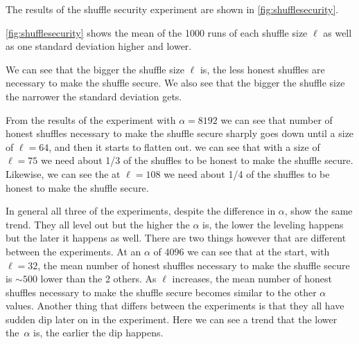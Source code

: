 The results of the shuffle security experiment are shown in \autoref{fig:shufflesecurity}.

\autoref{fig:shufflesecurity} shows the mean of the 1000 runs of each shuffle size $\ell$ as well as one standard deviation higher and lower.

We can see that the bigger the shuffle size $\ell$ is, the less honest shuffles are necessary to make the shuffle secure.
We also see that the bigger the shuffle size the narrower the standard deviation gets.

From the results of the experiment with $\alpha=8192$ we can see that number of honest shuffles necessary to make the shuffle secure sharply goes down until a size of $\ell=64$, and then it starts to flatten out.
we can see that with a size of $\ell=75$ we need about 1/3 of the shuffles to be honest to make the shuffle secure.
Likewise, we can see the at $\ell=108$ we need about 1/4 of the shuffles to be honest to make the shuffle secure.

In general all three of the experiments, despite the difference in $\alpha$, show the same trend.
They all level out but the higher the $\alpha$ is, the lower the leveling happens but the later it happens as well.
There are two things however that are different between the experiments.
At an $\alpha$ of 4096 we can see that at the start, with $\ell=32$, the mean number of honest shuffles necessary to make the shuffle secure is $\sim500$ lower than the 2 others.
As $\ell$ increases, the mean number of honest shuffles necessary to make the shuffle secure becomes similar to the other $\alpha$ values.
Another thing that differs between the experiments is that they all have sudden dip later on in the experiment.
Here we can see a trend that the lower the~$\alpha$ is, the earlier the dip happens.

